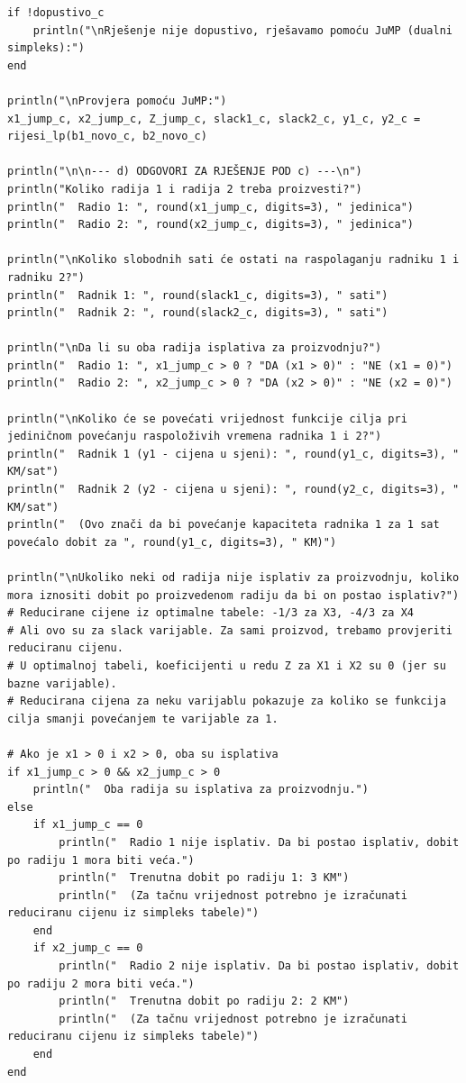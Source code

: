 \documentclass[12pt,a4paper]{article}
\begin{document}
\begin{lstlisting}[style=julia, caption={Julia kod za postoptimalnu analizu}]
if !dopustivo_c
    println("\nRješenje nije dopustivo, rješavamo pomoću JuMP (dualni simpleks):")
end

println("\nProvjera pomoću JuMP:")
x1_jump_c, x2_jump_c, Z_jump_c, slack1_c, slack2_c, y1_c, y2_c = rijesi_lp(b1_novo_c, b2_novo_c)

println("\n\n--- d) ODGOVORI ZA RJEŠENJE POD c) ---\n")
println("Koliko radija 1 i radija 2 treba proizvesti?")
println("  Radio 1: ", round(x1_jump_c, digits=3), " jedinica")
println("  Radio 2: ", round(x2_jump_c, digits=3), " jedinica")

println("\nKoliko slobodnih sati će ostati na raspolaganju radniku 1 i radniku 2?")
println("  Radnik 1: ", round(slack1_c, digits=3), " sati")
println("  Radnik 2: ", round(slack2_c, digits=3), " sati")

println("\nDa li su oba radija isplativa za proizvodnju?")
println("  Radio 1: ", x1_jump_c > 0 ? "DA (x1 > 0)" : "NE (x1 = 0)")
println("  Radio 2: ", x2_jump_c > 0 ? "DA (x2 > 0)" : "NE (x2 = 0)")

println("\nKoliko će se povećati vrijednost funkcije cilja pri jediničnom povećanju raspoloživih vremena radnika 1 i 2?")
println("  Radnik 1 (y1 - cijena u sjeni): ", round(y1_c, digits=3), " KM/sat")
println("  Radnik 2 (y2 - cijena u sjeni): ", round(y2_c, digits=3), " KM/sat")
println("  (Ovo znači da bi povećanje kapaciteta radnika 1 za 1 sat povećalo dobit za ", round(y1_c, digits=3), " KM)")

println("\nUkoliko neki od radija nije isplativ za proizvodnju, koliko mora iznositi dobit po proizvedenom radiju da bi on postao isplativ?")
# Reducirane cijene iz optimalne tabele: -1/3 za X3, -4/3 za X4
# Ali ovo su za slack varijable. Za sami proizvod, trebamo provjeriti reduciranu cijenu.
# U optimalnoj tabeli, koeficijenti u redu Z za X1 i X2 su 0 (jer su bazne varijable).
# Reducirana cijena za neku varijablu pokazuje za koliko se funkcija cilja smanji povećanjem te varijable za 1.

# Ako je x1 > 0 i x2 > 0, oba su isplativa
if x1_jump_c > 0 && x2_jump_c > 0
    println("  Oba radija su isplativa za proizvodnju.")
else
    if x1_jump_c == 0
        println("  Radio 1 nije isplativ. Da bi postao isplativ, dobit po radiju 1 mora biti veća.")
        println("  Trenutna dobit po radiju 1: 3 KM")
        println("  (Za tačnu vrijednost potrebno je izračunati reduciranu cijenu iz simpleks tabele)")
    end
    if x2_jump_c == 0
        println("  Radio 2 nije isplativ. Da bi postao isplativ, dobit po radiju 2 mora biti veća.")
        println("  Trenutna dobit po radiju 2: 2 KM")
        println("  (Za tačnu vrijednost potrebno je izračunati reduciranu cijenu iz simpleks tabele)")
    end
end


\end{lstlisting}
\end{document}
